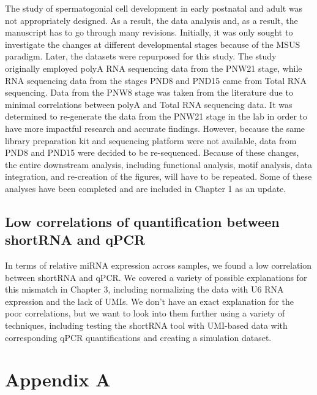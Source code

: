 \documentclass[12pt,twoside]{reedthesis}
\begin{document}
The study of spermatogonial cell development in early postnatal and adult was not appropriately designed. As a result, the data analysis and, as a result, the manuscript has to go through many revisions. Initially, it was only sought to investigate the changes at different developmental stages because of the MSUS paradigm. Later, the datasets were repurposed for this study. The study originally employed polyA RNA sequencing data from the PNW21 stage, while RNA sequencing data from the stages PND8 and PND15 came from Total RNA sequencing. Data from the PNW8 stage was taken from the literature due to minimal correlations between polyA and Total RNA sequencing data. It was determined to re-generate the data from the PNW21 stage in the lab in order to have more impactful research and accurate findings. However, because the same library preparation kit and sequencing platform were not available, data from PND8 and PND15 were decided to be re-sequenced. Because of these changes, the entire downstream analysis, including functional analysis, motif analysis, data integration, and re-creation of the figures, will have to be repeated. Some of these analyses have been completed and are included in Chapter 1 as an update.

\hypertarget{low-correlations-of-quantification-between-shortrna-and-qpcr}{%
\section*{Low correlations of quantification between shortRNA and qPCR}\label{low-correlations-of-quantification-between-shortrna-and-qpcr}}

In terms of relative miRNA expression across samples, we found a low correlation between shortRNA and qPCR. We covered a variety of possible explanations for this mismatch in Chapter 3, including normalizing the data with U6 RNA expression and the lack of UMIs. We don't have an exact explanation for the poor correlations, but we want to look into them further using a variety of techniques, including testing the shortRNA tool with UMI-based data with corresponding qPCR quantifications and creating a simulation dataset.

\hypertarget{aa}{%
\chapter*{Appendix A}\label{aa}}
\end{document}

